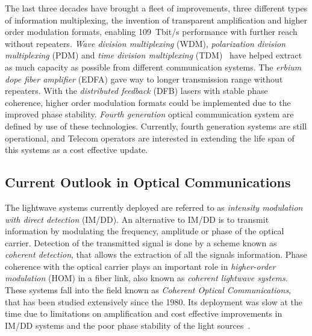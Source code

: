 The last three decades have brought a fleet of improvements, three different types of information multiplexing, the invention of transparent amplification and higher order modulation formats, enabling  109~Tbit/s performance with further reach without repeaters. \textit{Wave division multiplexing} (WDM), \textit{polarization division multiplexing} (PDM) and \textit{time division multiplexing} (TDM)~\cite{kikuchi2008coherent,ModForm,Sharma2013ARO} have helped extract as much capacity as possible from different communication systems. The \textit{erbium dope fiber amplifier} (EDFA) gave way to longer transmission range without repeaters. With the \textit{distributed feedback }(DFB) lasers with stable phase coherence, higher order modulation formats could be implemented due to the improved phase stability. \emph{Fourth generation} optical communication system are defined by use of these technologies. Currently, fourth generation systems are still operational, and Telecom operators are interested in extending the life span of this systems as a cost effective update.    

\subsection{Current Outlook in Optical Communications}


The lightwave systems currently deployed are referred to as \textit{intensity modulation with direct detection} (IM/DD). An alternative to IM/DD is to transmit information by modulating the frequency, amplitude or phase of the optical carrier. Detection of the transmitted signal is done by a scheme known as \textit{coherent detection}, that allows the extraction of all the signals information. Phase coherence with the optical carrier plays an important role in \textit{higher-order modulation} (HOM) in a fiber link, also known as \textit{coherent lightwave systems}. These systems fall into the field known as  \textit{Coherent Optical Communications}, that has been studied extensively since the 1980. Its deployment was slow at the time due to limitations on amplification and cost effective improvements in IM/DD systems and the poor phase stability of the light sources~\cite{FiberAgrawal,NetGenTransp}.

